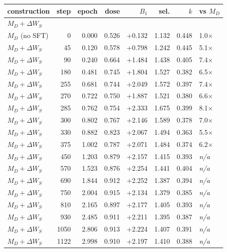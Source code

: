 \begin{table}[t]
\centering
\footnotesize
\setlength{\tabcolsep}{4pt}
\begin{tabular}{lrrrrrrl}
\toprule
construction & step & epoch & dose & $B_1$ & sel. & $k$ & vs $M_D$ \\
\midrule
\multicolumn{8}{l}{\emph{$M_D{+}\Delta W_S$}} \\
$M_D$ (no SFT) & 0 & 0.000 & 0.526 & +0.132 & 1.132 & 0.448 & 1.0$\times$ \\
$M_D{+}\Delta W_S$ & 45 & 0.120 & 0.578 & +0.798 & 1.242 & 0.445 & 5.1$\times$ \\
$M_D{+}\Delta W_S$ & 90 & 0.240 & 0.664 & +1.484 & 1.438 & 0.405 & 7.4$\times$ \\
$M_D{+}\Delta W_S$ & 180 & 0.481 & 0.745 & +1.804 & 1.527 & 0.382 & 6.5$\times$ \\
$M_D{+}\Delta W_S$ & 255 & 0.681 & 0.744 & +2.049 & 1.572 & 0.397 & 7.4$\times$ \\
$M_D{+}\Delta W_S$ & 270 & 0.722 & 0.750 & +1.887 & 1.521 & 0.380 & 6.6$\times$ \\
$M_D{+}\Delta W_S$ & 285 & 0.762 & 0.754 & +2.333 & 1.675 & 0.399 & 8.1$\times$ \\
$M_D{+}\Delta W_S$ & 300 & 0.802 & 0.767 & +2.146 & 1.589 & 0.378 & 7.0$\times$ \\
$M_D{+}\Delta W_S$ & 330 & 0.882 & 0.823 & +2.067 & 1.494 & 0.363 & 5.5$\times$ \\
$M_D{+}\Delta W_S$ & 375 & 1.002 & 0.787 & +2.071 & 1.484 & 0.374 & 6.2$\times$ \\
$M_D{+}\Delta W_S$ & 450 & 1.203 & 0.879 & +2.157 & 1.415 & 0.393 & \textit{n/a} \\
$M_D{+}\Delta W_S$ & 570 & 1.523 & 0.876 & +2.254 & 1.441 & 0.404 & \textit{n/a} \\
$M_D{+}\Delta W_S$ & 690 & 1.844 & 0.912 & +2.252 & 1.387 & 0.394 & \textit{n/a} \\
$M_D{+}\Delta W_S$ & 750 & 2.004 & 0.915 & +2.134 & 1.379 & 0.385 & \textit{n/a} \\
$M_D{+}\Delta W_S$ & 810 & 2.165 & 0.897 & +2.177 & 1.405 & 0.393 & \textit{n/a} \\
$M_D{+}\Delta W_S$ & 930 & 2.485 & 0.911 & +2.211 & 1.395 & 0.387 & \textit{n/a} \\
$M_D{+}\Delta W_S$ & 1050 & 2.806 & 0.913 & +2.224 & 1.407 & 0.391 & \textit{n/a} \\
$M_D{+}\Delta W_S$ & 1122 & 2.998 & 0.910 & +2.197 & 1.410 & 0.388 & \textit{n/a} \\

\end{tabular}
\end{table}
